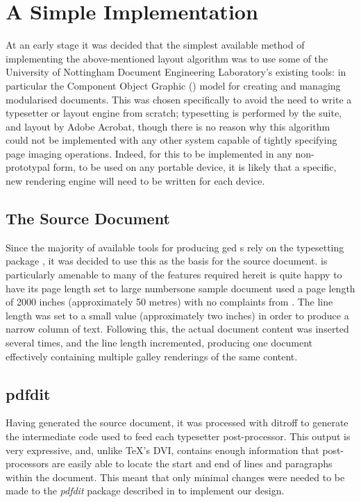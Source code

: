 \section{A Simple Implementation}
At an early stage it was decided that the simplest available method of implementing the above-mentioned layout algorithm was to use some of the University of Nottingham Document Engineering Laboratory's existing tools: in particular the Component Object Graphic (\COG{}) model\cite{Bagley2003} for creating and managing modularised \pdf{} documents. This was chosen specifically to avoid the need to write a typesetter or layout engine from scratch; typesetting is performed by the \troff{} suite, and layout by Adobe Acrobat, though there is no reason why this algorithm could not be implemented with any other system capable of tightly specifying page imaging operations. Indeed, for this to be implemented in any non-prototypal form, \ie{} to be used on any portable device, it is likely that a specific, new rendering engine will need to be written for each device.

\subsection{The Source Document}
Since the majority of available tools for producing \COG{}ged \pdf{}s rely on the typesetting package \ditroff{}, it was decided to use this as the basis for the source document. \Ditroff{} is particularly amenable to many of the features required here\ed{}it is quite happy to have its page length set to large numbers\ed{}one sample document used a page length of 2000 inches (approximately 50 metres) with no complaints from \ditroff{}. The line length was set to a small value (approximately two inches) in order to produce a narrow column of text. Following this, the actual document content was inserted several times, and the line length incremented, producing one document effectively containing multiple galley renderings of the same content.

\subsection{pdfdit}
Having generated the source document, it was processed with ditroff to generate the intermediate code used to feed each typesetter post-pro\-cessor. This output is very expressive, and, unlike \TeX's DVI, contains enough information that post-processors are easily able to locate the start and end of lines and paragraphs within the document. This meant that only minimal changes were needed to be made to the \emph{pdfdit} package described in \cite{Bagley2003} to implement our design.

